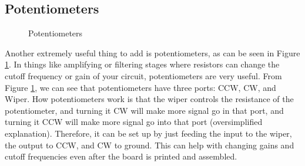 \subsection{Potentiometers}
\begin{figure}[H]
  \centering
\caption{Potentiometers}
\label{img:pot}
\end{figure}

Another extremely useful thing to add is potentiometers, as can be seen in Figure \ref{img:pot}. In things like amplifying or
filtering stages where resistors can change the cutoff frequency or gain of your circuit, potentiometers are very useful. From
Figure \ref{img:pot}, we can see that potentiometers have three ports: CCW, CW, and Wiper. How potentiometers work is that the
wiper controls the resistance of the potentiometer, and turning it CW will make more signal go in that port, and turning it CCW will
make more signal go into that port (oversimplified explanation). Therefore, it can be set up by just feeding the input to the wiper,
the output to CCW, and CW to ground. This can help with changing gains and cutoff frequencies even after the board is printed and
assembled.

